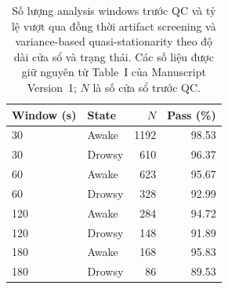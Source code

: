 \begin{table}[htbp]
\centering
\caption{Số lượng analysis windows trước QC và tỷ lệ vượt qua đồng thời artifact screening và variance-based quasi-stationarity theo độ dài cửa sổ và trạng thái. Các số liệu được giữ nguyên từ Table~I của Manuscript Version~1; $N$ là số cửa sổ trước QC.}
\label{tab:supp_qc_window_duration}
\begin{tabular}{llrr}
\hline
Window (s) & State & $N$ & Pass (\%) \\
\hline
30  & Awake  & 1192 & 98.53 \\
30  & Drowsy & 610  & 96.37 \\
60  & Awake  & 623  & 95.67 \\
60  & Drowsy & 328  & 92.99 \\
120 & Awake  & 284  & 94.72 \\
120 & Drowsy & 148  & 91.89 \\
180 & Awake  & 168  & 95.83 \\
180 & Drowsy & 86   & 89.53 \\
\hline
\end{tabular}
\end{table}
